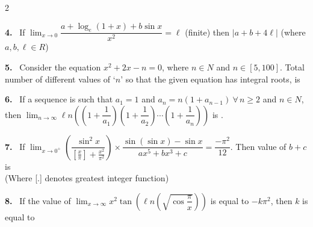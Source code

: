 \documentclass[10pt]{extarticle}
\newcommand{\qn}[1]{\par\smallskip\noindent\textbf{#1.}~}
\begin{document}
\begin{multicols}{2}
\qn{4} If $\displaystyle\lim_{x\to0}\dfrac{a+\log_e(1+x)+b\sin x}{x^2}=\ell$ (finite) then $|a+b+4\ell|$ (where $a,b,\ell\in R$)
\qn{5} Consider the equation $x^2+2x-n=0$, where $n\in N$ and $n\in[5,100]$. Total number of different values of `$n$' so that the given equation has integral roots, is
\qn{6} If a sequence is such that $a_1=1$ and $a_n=n(1+a_{n-1})\ \forall\,n\ge2$ and $n\in N$, then $\displaystyle\lim_{n\to\infty}\ell n\left(\left(1+\dfrac1{a_1}\right)\left(1+\dfrac1{a_2}\right)\cdots\left(1+\dfrac1{a_n}\right)\right)$ is \underline{\hspace{1.5cm}}.
\qn{7} If $\displaystyle\lim_{x\to0^+}\left(\dfrac{\sin^2x}{\left[\frac x\pi\right]+\frac{x^2}{\pi^2}}\right)\times\dfrac{\sin(\sin x)-\sin x}{ax^5+bx^3+c}=\dfrac{-\pi^2}{12}$. Then value of $b+c$ is\\
(Where [.] denotes greatest integer function)
\qn{8} If the value of $\displaystyle\lim_{x\to\infty}x^2\tan\left(\ell n\left(\sqrt{\cos\dfrac\pi x}\right)\right)$ is equal to $-k\pi^2$, then $k$ is equal to
\end{multicols}
\end{document}
